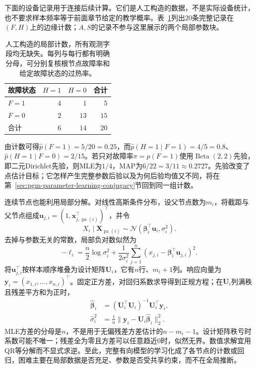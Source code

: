 下面的设备记录用于连接后续计算。它们是人工构造的数据，不是实际设备统计，也不要求样本频率等于前面章节给定的教学概率。表~\ref{tab:pgm-parameter-learning-device-counts}列出$20$条完整记录在$(F,H)$上的边缘计数；$A,S$的记录不参与这里展示的两个局部参数块。

\begin{table}[htbp]
  \centering
  \begin{tabular}{lrrr}
    \toprule
    故障状态 & $H=1$ & $H=0$ & 合计\\
    \midrule
    $F=1$ & $4$ & $1$ & $5$\\
    $F=0$ & $2$ & $13$ & $15$\\
    \midrule
    合计 & $6$ & $14$ & $20$\\
    \bottomrule
  \end{tabular}
  \caption{人工构造的局部计数，所有观测字段均无缺失。每列与每行都有明确分母，可分别复核根节点故障率和给定故障状态的过热率。}
  \label{tab:pgm-parameter-learning-device-counts}
\end{table}

由计数可得$\widehat p(F=1)=5/20=0.25$，而$\widehat p(H=1\mid F=1)=4/5=0.8$、$\widehat p(H=1\mid F=0)=2/15$。若只对故障率$\pi=p(F=1)$使用$\operatorname{Beta}(2,2)$先验，即二元Dirichlet先验，则MLE为$1/4$，MAP为$6/22=3/11\approx0.2727$。先验改变了点估计目标；它怎样产生完整参数后验以及为何后验均值又不同，将在第~\ref{sec:pgm-parameter-learning-conjugacy}节回到同一组计数。

连续节点也能利用局部分解。对线性高斯条件分布，设父节点数为$m_i$，将截距与父节点组成$\bm{u}_{j,i}=(1,\bm{x}_{j,\operatorname{pa}(i)}^\top)^\top$，并令
\[
  X_i\mid\bm{X}_{\operatorname{pa}(i)}
  \sim\mathcal{N}(\bm{\beta}_i^\top\bm{u}_i,\sigma_i^2).
\]
去掉与参数无关的常数，局部负对数似然为
\[
  -\ell_i
  =\frac{n}{2}\log\sigma_i^2+
    \frac{1}{2\sigma_i^2}
      \sum_{j=1}^n(x_{j,i}-\bm{\beta}_i^\top\bm{u}_{j,i})^2.
\]
将$\bm{u}_{j,i}^\top$按样本顺序堆叠为设计矩阵$\bm{U}_i$，它有$n$行、$m_i+1$列。响应向量为$\bm{y}_i=(x_{1,i},\ldots,x_{n,i})^\top$。固定正方差，对回归系数求导得到正规方程；在$\bm{U}_i$列满秩且残差平方和为正时，
\begin{equation}
  \begin{aligned}
    \widehat{\bm{\beta}}_i
      &=(\bm{U}_i^\top\bm{U}_i)^{-1}\bm{U}_i^\top\bm{y}_i,\\
    \widehat{\sigma}_i^2
      &=\frac{1}{n}
        \lVert\bm{y}_i-\bm{U}_i\widehat{\bm{\beta}}_i\rVert_2^2.
  \end{aligned}
  \label{eq:pgm-parameter-learning-gaussian-mle}
\end{equation}
MLE方差的分母是$n$，不是用于无偏残差方差估计的$n-m_i-1$。设计矩阵秩亏时系数可能不唯一；残差全为零且方差可以任意趋近$0$时，似然无界。数值求解宜用QR等分解而不显式求逆。至此，完整有向模型的学习化成了各节点的计数或回归，困难主要在局部数据是否充足、参数是否受共享约束，而不在全局推断。

